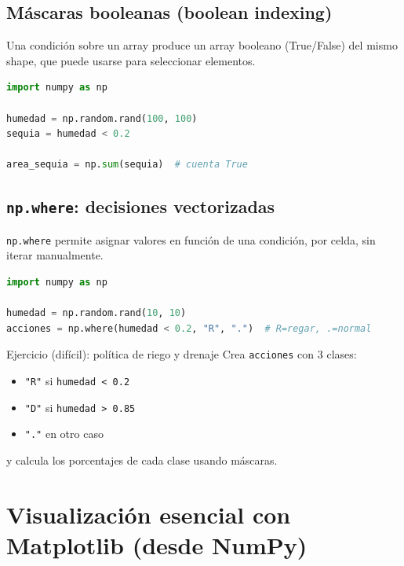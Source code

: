 \documentclass[11pt, a4paper]{article}
\begin{document}
\subsection{Máscaras booleanas (boolean indexing)}
Una condición sobre un array produce un array booleano (True/False) del mismo shape, que puede usarse para seleccionar elementos.

\begin{lstlisting}[language=Python, caption={Máscara + conteo de celdas en sequía}]
import numpy as np

humedad = np.random.rand(100, 100)
sequia = humedad < 0.2

area_sequia = np.sum(sequia)  # cuenta True
\end{lstlisting}

\subsection{\texttt{np.where}: decisiones vectorizadas}
\texttt{np.where} permite asignar valores en función de una condición, por celda, sin iterar manualmente.

\begin{lstlisting}[language=Python, caption={Mapa de acciones con np.where}]
import numpy as np

humedad = np.random.rand(10, 10)
acciones = np.where(humedad < 0.2, "R", ".")  # R=regar, .=normal
\end{lstlisting}

\begin{agrobox}{Ejercicio (difícil): política de riego y drenaje}
Crea \texttt{acciones} con 3 clases:
\begin{itemize}
\item \texttt{"R"} si \texttt{humedad < 0.2}
\item \texttt{"D"} si \texttt{humedad > 0.85}
\item \texttt{"."} en otro caso
\end{itemize}
y calcula los porcentajes de cada clase usando máscaras.
\end{agrobox}
\newpage
\section{Visualización esencial con Matplotlib (desde NumPy)}
\end{document}
